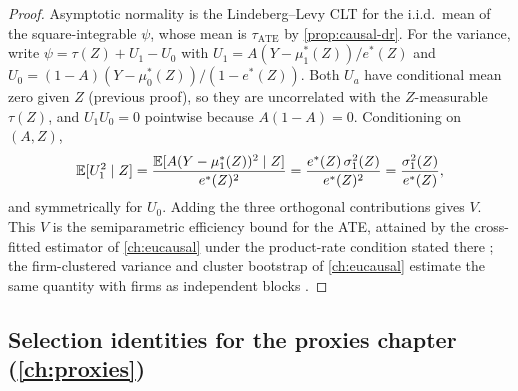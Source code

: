 \begin{proof}
Asymptotic normality is the Lindeberg--Levy CLT for the i.i.d.\ mean of the square-integrable $\psi$,
whose mean is $\tau_{\mathrm{ATE}}$ by \cref{prop:causal-dr}. For the variance, write $\psi = \tau(Z)
+ U_1 - U_0$ with $U_1 = A(Y - \mu_1^*(Z))/e^*(Z)$ and $U_0 = (1-A)(Y - \mu_0^*(Z))/(1 - e^*(Z))$.
Both $U_a$ have conditional mean zero given $Z$ (previous proof), so they are uncorrelated with the
$Z$-measurable $\tau(Z)$, and $U_1 U_0 = 0$ pointwise because $A(1-A) = 0$. Conditioning on $(A, Z)$,
\[
\mathbb{E}[U_1^2 \mid Z] = \frac{\mathbb{E}[A (Y - \mu_1^*(Z))^2 \mid Z]}{e^*(Z)^2}
= \frac{e^*(Z)\, \sigma_1^2(Z)}{e^*(Z)^2} = \frac{\sigma_1^2(Z)}{e^*(Z)},
\]
and symmetrically for $U_0$. Adding the three orthogonal contributions gives $V$. This $V$ is the
semiparametric efficiency bound for the ATE, attained by the cross-fitted estimator of
\cref{ch:eucausal} under the product-rate condition stated there \citep{chernozhukov2018}; the
firm-clustered variance and cluster bootstrap of \cref{ch:eucausal} estimate the same quantity with
firms as independent blocks \citep{efron1994}.
\end{proof}
\subsection{Selection identities for the proxies chapter (\cref{ch:proxies})}

